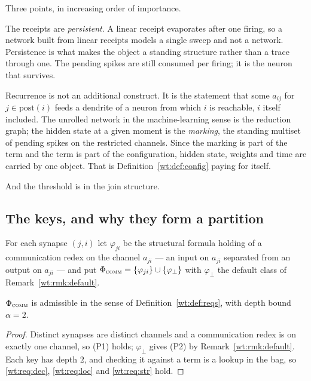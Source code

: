 Three points, in increasing order of importance.

The receipts are \emph{persistent}. A linear receipt evaporates after one firing, so a
network built from linear receipts models a single sweep and not a network. Persistence
is what makes the object a standing structure rather than a trace through one. The
pending spikes are still consumed per firing; it is the neuron that survives.

Recurrence is not an additional construct. It is the statement that some $a_{ij}$ for
$j \in \mathrm{post}(i)$ feeds a dendrite of a neuron from which $i$ is reachable, $i$
itself included. The unrolled network in the machine-learning sense is the reduction
graph; the hidden state at a given moment is the \emph{marking}, the standing multiset of
pending spikes on the restricted channels. Since the marking is part of the term and the
term is part of the configuration, hidden state, weights and time are carried by one
object. That is Definition~\ref{wt:def:config} paying for itself.

And the threshold is in the join structure.

\subsection{The keys, and why they form a partition}

\begin{definition}
\label{spk:def:keys}
For each synapse $(j,i)$ let $\varphi_{ji}$ be the structural formula holding of a
communication redex on the channel $a_{ji}$ --- an input on $a_{ji}$ separated from an
output on $a_{ji}$ --- and put
$\Phi_{\textsc{comm}} = \{\varphi_{ji}\} \cup \{\varphi_{\bot}\}$ with $\varphi_{\bot}$
the default class of Remark~\ref{wt:rmk:default}.
\end{definition}

\begin{proposition}
\label{spk:prop:admissible}
$\Phi_{\textsc{comm}}$ is admissible in the sense of Definition~\ref{wt:def:reqs}, with
depth bound $\alpha = 2$.
\end{proposition}

\begin{proof}
Distinct synapses are distinct channels and a communication redex is on exactly one
channel, so (P1) holds; $\varphi_{\bot}$ gives (P2) by Remark~\ref{wt:rmk:default}. Each
key has depth $2$, and checking it against a term is a lookup in the bag, so
\ref{wt:req:dec}, \ref{wt:req:loc} and \ref{wt:req:str} hold.
\end{proof}


